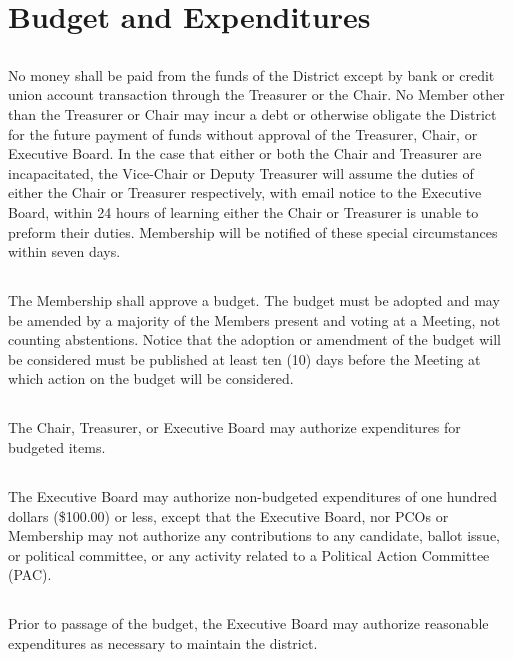 \section{Budget and Expenditures}
\subsection{}
No money shall be paid from the funds of the \fortythird{} District except by bank or credit union account transaction through the Treasurer or the Chair. No Member other than the Treasurer or Chair may incur a debt or otherwise obligate the \fortythird{} District for the future payment of funds without approval of the Treasurer, Chair, or Executive Board. In the case that either or both the Chair and Treasurer are incapacitated, the Vice-Chair or Deputy Treasurer will assume the duties of either the Chair or Treasurer respectively, with email notice to the Executive Board, within 24 hours of learning either the Chair or Treasurer is unable to preform their duties. Membership will be notified of these special circumstances within seven days.

\subsection{}\label{budget-adoption}
The Membership shall approve a budget. The budget must be adopted and may be amended by a majority of the Members present and voting at a Meeting, not counting abstentions. Notice that the adoption or amendment of the budget will be considered must be published at least ten (10) days before the Meeting at which action on the budget will be considered.

\subsection{}
The Chair, Treasurer, or Executive Board may authorize expenditures for budgeted items.

\subsection{}
The Executive Board may authorize non-budgeted expenditures of one hundred dollars (\$100.00) or less, except that the Executive Board, nor PCOs or Membership may not authorize any contributions to any candidate, ballot issue, or political committee, or any activity related to a Political Action Committee (PAC).

\subsection{}
Prior to passage of the budget, the Executive Board may authorize reasonable expenditures as necessary to maintain the district.

